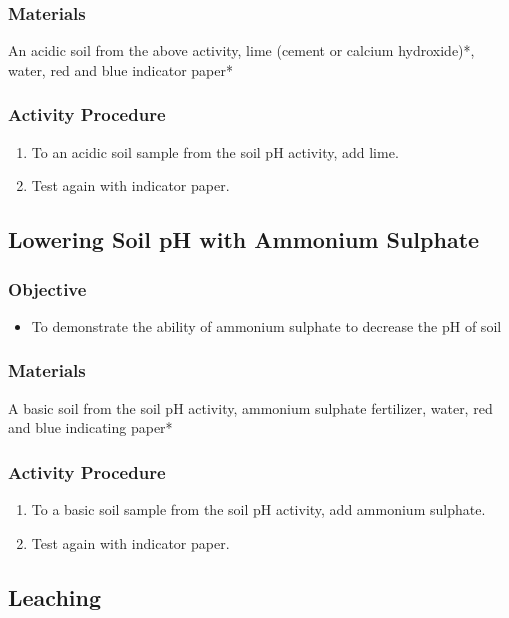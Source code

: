 \subsubsection{Materials}
An acidic soil from the above activity, lime (cement or calcium hydroxide)*, water, red and blue indicator paper*

\subsubsection{Activity Procedure}
\begin{enumerate}
\item{To an acidic soil sample from the soil pH activity, add lime.}
\item{Test again with indicator paper.}
\end{enumerate}

\subsection{Lowering Soil pH with Ammonium Sulphate}

\subsubsection{Objective}
\begin{itemize}
\item{To demonstrate the ability of ammonium sulphate to decrease the pH of soil}
\end{itemize}

\subsubsection{Materials}
A basic soil from the soil pH activity, ammonium sulphate fertilizer, water, red and blue indicating paper*

\subsubsection{Activity Procedure}
\begin{enumerate}
\item{To a basic soil sample from the soil pH activity, add ammonium sulphate.}
\item{Test again with indicator paper.}
\end{enumerate}

\subsection{Leaching}

